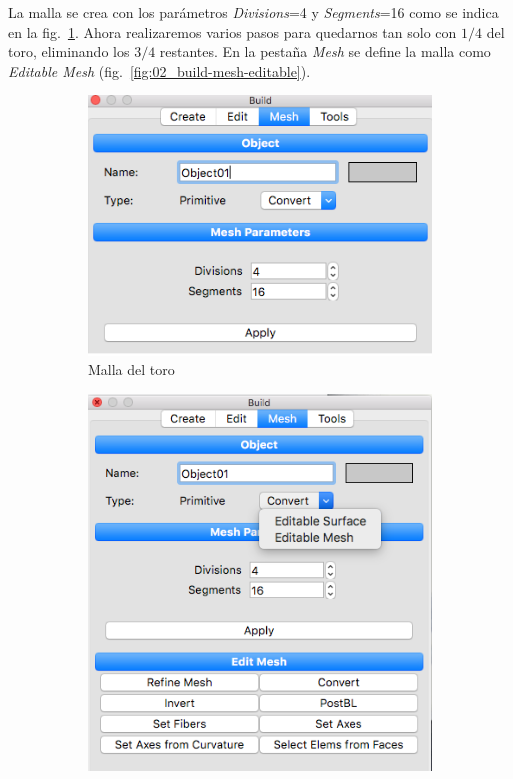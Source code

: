 La malla se crea con los parámetros \emph{Divisions}=4 y \emph{Segments}=16 como se indica en la fig.~\ref{fig:01_build-torusmesh}.
Ahora realizaremos varios pasos para quedarnos tan solo con $1/4$ del toro, eliminando los $3/4$ restantes.
En la pestaña \emph{Mesh} se define la malla como \emph{Editable Mesh} (fig.~\ref{fig:02_build-mesh-editable}).
\begin{figure}[!ht]
\centering
\begin{subfigure}[b]{0.30\textwidth}
\centering
\includegraphics[width=\linewidth]{figuras_4/01_build-torusmesh.png}
\caption{Malla del toro}
\label{fig:01_build-torusmesh}
\end{subfigure}
\begin{subfigure}[b]{0.30\textwidth}
\includegraphics[width=\linewidth]{figuras_4/02_build-mesh-editable.png}

\end{subfigure}
\end{figure}
